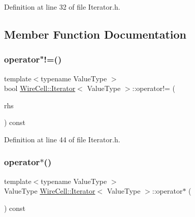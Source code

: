 Definition at line 32 of file Iterator.\+h.



\subsection{Member Function Documentation}
\mbox{\label{class_wire_cell_1_1_iterator_a7b3b0221d24e37b96b9c988a41b3a7e8}} 
\subsubsection{\texorpdfstring{operator"!=()}{operator!=()}}
{\footnotesize\ttfamily template$<$typename Value\+Type $>$ \\
bool \hyperlink{class_wire_cell_1_1_iterator}{Wire\+Cell\+::\+Iterator}$<$ Value\+Type $>$\+::operator!= (\begin{DoxyParamCaption}\item[{const \hyperlink{class_wire_cell_1_1_iterator}{Iterator}$<$ Value\+Type $>$ \&}]{rhs }\end{DoxyParamCaption}) const\hspace{0.3cm}{\ttfamily [inline]}}



Definition at line 44 of file Iterator.\+h.

\mbox{\label{class_wire_cell_1_1_iterator_a4b18762cb1e90376b7cce7d82a808f20}} 
\subsubsection{\texorpdfstring{operator$\ast$()}{operator*()}}
{\footnotesize\ttfamily template$<$typename Value\+Type $>$ \\
Value\+Type \hyperlink{class_wire_cell_1_1_iterator}{Wire\+Cell\+::\+Iterator}$<$ Value\+Type $>$\+::operator$\ast$ (\begin{DoxyParamCaption}{ }\end{DoxyParamCaption}) const\hspace{0.3cm}{\ttfamily [inline]}}



